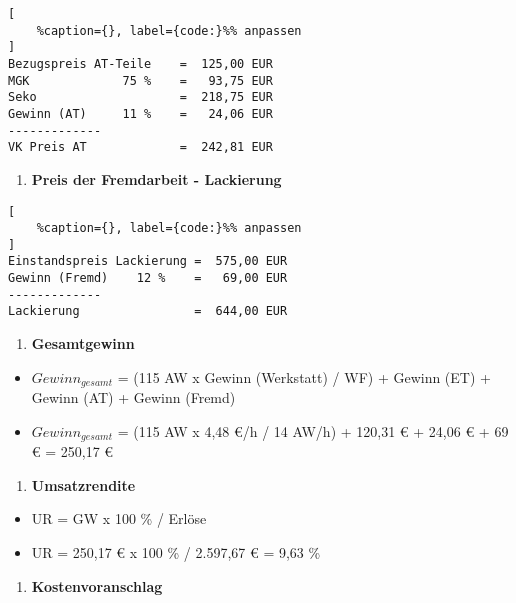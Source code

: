 \lstset{language=Python}%
\begin{lstlisting}[
	%caption={}, label={code:}%% anpassen
]
Bezugspreis AT-Teile    =  125,00 EUR
MGK             75 %    =   93,75 EUR
Seko                    =  218,75 EUR
Gewinn (AT)     11 %    =   24,06 EUR
-------------
VK Preis AT             =  242,81 EUR
\end{lstlisting}

\begin{enumerate}
\def\labelenumi{\alph{enumi})}
\setcounter{enumi}{2}
\item
  \textbf{Preis der Fremdarbeit - Lackierung}
\end{enumerate}

\lstset{language=Python}%
\begin{lstlisting}[
	%caption={}, label={code:}%% anpassen
]
Einstandspreis Lackierung =  575,00 EUR
Gewinn (Fremd)    12 %    =   69,00 EUR
-------------
Lackierung                =  644,00 EUR
\end{lstlisting}

\begin{enumerate}
\def\labelenumi{\alph{enumi})}
\setcounter{enumi}{3}
\item
  \textbf{Gesamtgewinn}
\end{enumerate}

\begin{itemize}
\item
  $Gewinn_{gesamt}$ = (115 AW x Gewinn (Werkstatt) / WF) + Gewinn (ET)
  + Gewinn (AT) + Gewinn (Fremd)
\item
  $Gewinn_{gesamt}$ = (115 AW x 4,48 €/h / 14 AW/h) + 120,31 € + 24,06
  € + 69 € = 250,17 €
\end{itemize}

\begin{enumerate}
\def\labelenumi{\alph{enumi})}
\setcounter{enumi}{4}
\item
  \textbf{Umsatzrendite}
\end{enumerate}

\begin{itemize}
\item
  UR = GW x 100 \% / Erlöse
\item
  UR = 250,17 € x 100 \% / 2.597,67 € = 9,63 \%
\end{itemize}

\begin{enumerate}
\def\labelenumi{\alph{enumi})}
\setcounter{enumi}{5}
\item
  \textbf{Kostenvoranschlag}
\end{enumerate}

